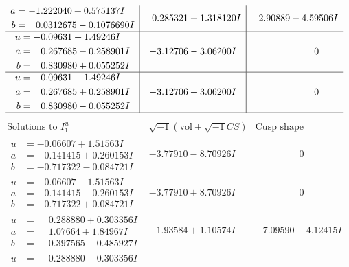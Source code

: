 \documentclass[1p]{elsarticle_modified}
\theoremstyle{definition}
\newcommand{\I}{\sqrt{-1}}
\begin{document}
$$\begin{array}{c|c|c}
\begin{aligned}
a &= -1.222040 + 0.575137 I \\
b &= \phantom{-}0.0312675 - 0.1076690 I\end{aligned}
 & \phantom{-}0.285321 + 1.318120 I & \phantom{-}2.90889 - 4.59506 I \\ \hline\begin{aligned}
u &= -0.09631 + 1.49246 I \\
a &= \phantom{-}0.267685 - 0.258901 I \\
b &= \phantom{-}0.830980 + 0.055252 I\end{aligned}
 & -3.12706 - 3.06200 I & \phantom{-0.000000 } 0 \\ \hline\begin{aligned}
u &= -0.09631 - 1.49246 I \\
a &= \phantom{-}0.267685 + 0.258901 I \\
b &= \phantom{-}0.830980 - 0.055252 I\end{aligned}
 & -3.12706 + 3.06200 I & \phantom{-0.000000 } 0\\
 \hline 
 \end{array}$$\newpage$$\begin{array}{c|c|c}  
\text{Solutions to }I^u_{1}& \I (\text{vol} + \sqrt{-1}CS) & \text{Cusp shape}\\
 \hline 
\begin{aligned}
u &= -0.06607 + 1.51563 I \\
a &= -0.141415 + 0.260153 I \\
b &= -0.717322 - 0.084721 I\end{aligned}
 & -3.77910 - 8.70926 I & \phantom{-0.000000 } 0 \\ \hline\begin{aligned}
u &= -0.06607 - 1.51563 I \\
a &= -0.141415 - 0.260153 I \\
b &= -0.717322 + 0.084721 I\end{aligned}
 & -3.77910 + 8.70926 I & \phantom{-0.000000 } 0 \\ \hline\begin{aligned}
u &= \phantom{-}0.288880 + 0.303356 I \\
a &= \phantom{-}1.07664 + 1.84967 I \\
b &= \phantom{-}0.397565 - 0.485927 I\end{aligned}
 & -1.93584 + 1.10574 I & -7.09590 - 4.12415 I \\ \hline\begin{aligned}
u &= \phantom{-}0.288880 - 0.303356 I \\

\end{aligned}
\end{array}$$
\end{document}
